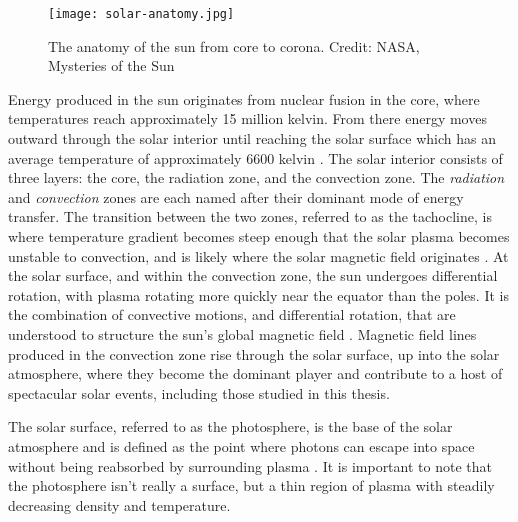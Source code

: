 \begin{figure}
	\texttt{[image: solar-anatomy.jpg]}
	\caption{The anatomy of the sun from core to corona. Credit: NASA, Mysteries of the Sun}\label{fig:anatomy}
\end{figure} 
 

 
Energy produced in the sun originates from nuclear fusion in the core, where temperatures reach approximately 15 million kelvin.
From there energy moves outward through the solar interior until reaching the solar surface which has an average temperature of approximately 6600 kelvin  \citep{SolarPhysicsOverview}. 
The solar interior consists of three layers: the core, the radiation zone, and the convection zone.
The \emph{radiation} and \emph{convection} zones are each named after their dominant mode of energy transfer.
The transition between the two zones, referred to as the tachocline, is where temperature gradient becomes steep enough that the solar plasma becomes unstable to convection, and is likely where the solar magnetic field originates \citep{SolarPhysicsOverview}.
At the solar surface, and within the convection zone, the sun undergoes differential rotation, with plasma rotating more quickly near the equator than the poles.
It is the combination of convective motions, and differential rotation, that are understood to structure  the sun's global magnetic field \citep{Parker1979,Priest2014,JudgeBook}.
Magnetic field lines produced in the convection zone rise through the solar surface, up into the solar atmosphere, where they become the dominant player and contribute to a host of spectacular solar events, including those studied in this thesis.


The solar surface, referred to as the photosphere, is the base of the solar atmosphere and is defined as the point where photons can escape into space without being reabsorbed by surrounding plasma \citep{Priest2014}.
It is important to note that the photosphere isn't really a surface, but a thin region of plasma with steadily decreasing density and temperature.

